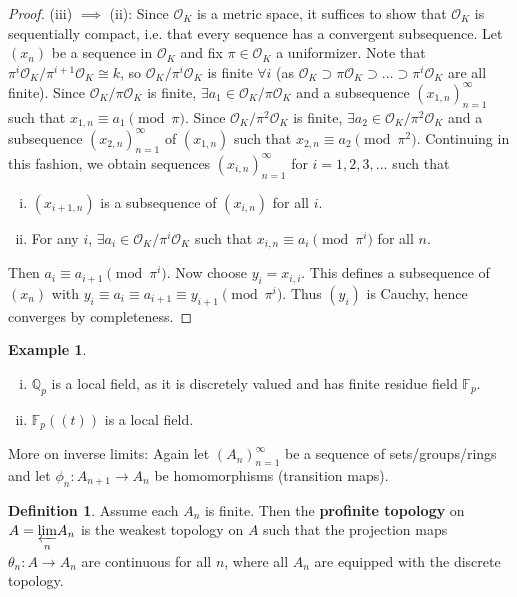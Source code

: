 \documentclass{article}
\theoremstyle{definition}
\newtheorem{example}{Example}[section]
\newtheorem{defn}{Definition}[section]
\begin{document}
\begin{proof}
    (iii) $\implies $ (ii): Since $\mathcal{O}_K$ is a metric space, it suffices to show that $\mathcal{O}_K$ is sequentially compact, i.e. that every sequence has a convergent subsequence. Let $(x_n)$ be a sequence in $\mathcal{O}_K$ and fix $\pi \in \mathcal{O}_K$ a uniformizer. Note that $\pi^i \mathcal{O}_K/\pi^{i+1}\mathcal{O}_K \cong k$, so $\mathcal{O}_K/\pi^i \mathcal{O}_K$ is finite $\forall i$ (as $\mathcal{O}_K \supset \pi \mathcal{O}_K \supset \ldots \supset \pi^i \mathcal{O}_K$ are all finite). Since $\mathcal{O}_K/\pi \mathcal{O}_K$ is finite, $\exists a_1 \in \mathcal{O}_K / \pi \mathcal{O}_K$ and a subsequence $(x_{1,n})_{n=1}^{\infty}$ such that $x_{1,n} \equiv a_1 \pmod{\pi}$. Since $\mathcal{O}_K/ \pi^2 \mathcal{O}_K$ is finite, $\exists a_2 \in \mathcal{O}_K/ \pi^2 \mathcal{O}_K$ and a subsequence $(x_{2,n})_{n=1}^{\infty}$ of $(x_{1,n})$ such that $x_{2,n} \equiv a_2 \pmod{\pi^2}$. Continuing in this fashion, we obtain sequences $(x_{i,n})_{n=1}^{\infty}$ for $i = 1,2,3,\ldots $ such that 
    \begin{enumerate}[(i)]
        \item $(x_{i+1,n})$ is a subsequence of $(x_{i,n})$ for all $i$.
        \item For any $i$, $\exists a_i \in \mathcal{O}_K/\pi^i \mathcal{O}_K$ such that $x_{i,n} \equiv a_i \pmod{\pi^i}$ for all $n$.
    \end{enumerate}
    Then $a_i \equiv a_{i+1} \pmod{\pi^i}$. Now choose $y_i = x_{i,i}$. This defines a subsequence of $(x_n)$ with $y_i \equiv a_i \equiv a_{i+1} \equiv y_{i+1} \pmod{ \pi^i}$. Thus $(y_i)$ is Cauchy, hence converges by completeness.
\end{proof}
\begin{example}
    \begin{enumerate}[(i)]
        \item $\mathbb{Q}_p$ is a local field, as it is discretely valued and has finite residue field $\mathbb{F}_p$.
        \item $\mathbb{F}_p((t))$ is a local field.
    \end{enumerate}
\end{example}
More on inverse limits: Again let $(A_n)_{n=1}^{\infty}$ be a sequence of sets/groups/rings and let $\phi_n : A_{n+1} \to A_n$ be homomorphisms (transition maps).
\begin{defn}
    Assume each $A_n$ is finite. Then the \textbf{profinite topology} on $A = \underset{n}{\varprojlim} A_n $ is the weakest topology on $A$ such that the projection maps $\theta_n : A \to A_n$ are continuous for all $n$, where all $A_n$ are equipped with the discrete topology.
\end{defn}
\end{document}
